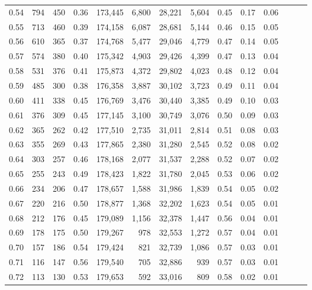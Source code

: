 \begin{tabular}{rrrrrrrrrrrrrr}
0.54 &    794 &  450 &  0.36 &  173,445 &    6,800 &  28,221 &   5,604 &  0.45 &  0.17 &      0.06 \\
0.55 &    713 &  460 &  0.39 &  174,158 &    6,087 &  28,681 &   5,144 &  0.46 &  0.15 &      0.05 \\
0.56 &    610 &  365 &  0.37 &  174,768 &    5,477 &  29,046 &   4,779 &  0.47 &  0.14 &      0.05 \\
0.57 &    574 &  380 &  0.40 &  175,342 &    4,903 &  29,426 &   4,399 &  0.47 &  0.13 &      0.04 \\
0.58 &    531 &  376 &  0.41 &  175,873 &    4,372 &  29,802 &   4,023 &  0.48 &  0.12 &      0.04 \\
0.59 &    485 &  300 &  0.38 &  176,358 &    3,887 &  30,102 &   3,723 &  0.49 &  0.11 &      0.04 \\
0.60 &    411 &  338 &  0.45 &  176,769 &    3,476 &  30,440 &   3,385 &  0.49 &  0.10 &      0.03 \\
0.61 &    376 &  309 &  0.45 &  177,145 &    3,100 &  30,749 &   3,076 &  0.50 &  0.09 &      0.03 \\
0.62 &    365 &  262 &  0.42 &  177,510 &    2,735 &  31,011 &   2,814 &  0.51 &  0.08 &      0.03 \\
0.63 &    355 &  269 &  0.43 &  177,865 &    2,380 &  31,280 &   2,545 &  0.52 &  0.08 &      0.02 \\
0.64 &    303 &  257 &  0.46 &  178,168 &    2,077 &  31,537 &   2,288 &  0.52 &  0.07 &      0.02 \\
0.65 &    255 &  243 &  0.49 &  178,423 &    1,822 &  31,780 &   2,045 &  0.53 &  0.06 &      0.02 \\
0.66 &    234 &  206 &  0.47 &  178,657 &    1,588 &  31,986 &   1,839 &  0.54 &  0.05 &      0.02 \\
0.67 &    220 &  216 &  0.50 &  178,877 &    1,368 &  32,202 &   1,623 &  0.54 &  0.05 &      0.01 \\
0.68 &    212 &  176 &  0.45 &  179,089 &    1,156 &  32,378 &   1,447 &  0.56 &  0.04 &      0.01 \\
0.69 &    178 &  175 &  0.50 &  179,267 &      978 &  32,553 &   1,272 &  0.57 &  0.04 &      0.01 \\
0.70 &    157 &  186 &  0.54 &  179,424 &      821 &  32,739 &   1,086 &  0.57 &  0.03 &      0.01 \\
0.71 &    116 &  147 &  0.56 &  179,540 &      705 &  32,886 &     939 &  0.57 &  0.03 &      0.01 \\
0.72 &    113 &  130 &  0.53 &  179,653 &      592 &  33,016 &     809 &  0.58 &  0.02 &      0.01 \\

\end{tabular}
